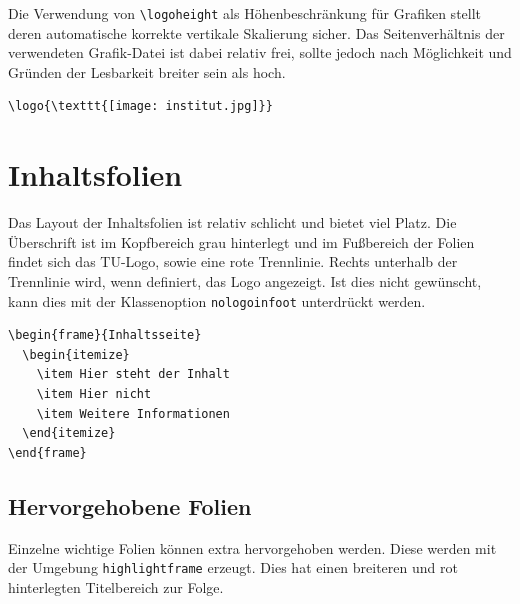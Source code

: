 \documentclass[cmyk,a4paper,colorscheme=green,TUBStitlepage=picture]{tubsreprt}
\begin{document}
Die Verwendung von \lstinline{\logoheight} als Höhenbeschränkung für Grafiken
stellt deren automatische korrekte vertikale Skalierung sicher.
Das Seitenverhältnis der verwendeten Grafik-Datei ist dabei relativ
frei, sollte jedoch nach Möglichkeit und Gründen der Lesbarkeit breiter sein als
hoch.

\begin{example}
\begin{lstlisting}
\logo{\texttt{[image: institut.jpg]}}
\end{lstlisting}
\end{example}


\section{Inhaltsfolien}

Das Layout der Inhaltsfolien ist relativ schlicht und bietet viel Platz.
Die Überschrift ist im Kopfbereich grau hinterlegt und im Fußbereich der Folien
findet sich das TU-Logo, sowie eine rote Trennlinie.
Rechts unterhalb der Trennlinie wird, wenn definiert, das Logo angezeigt.
Ist dies nicht gewünscht, kann dies mit der Klassenoption
\lstinline{nologoinfoot} unterdrückt werden.

\begin{minipage}{0.5\textwidth}
\begin{verbatim}
\begin{frame}{Inhaltsseite}
  \begin{itemize}
    \item Hier steht der Inhalt
    \item Hier nicht
    \item Weitere Informationen
  \end{itemize}
\end{frame}
\end{verbatim}
\end{minipage}
\begin{minipage}{0.5\textwidth}
\end{minipage}

\subsection{Hervorgehobene Folien}

Einzelne wichtige Folien können extra hervorgehoben werden. Diese werden mit
der Umgebung \lstinline{highlightframe} erzeugt. Dies hat einen breiteren und
rot hinterlegten Titelbereich zur Folge.
\end{document}
